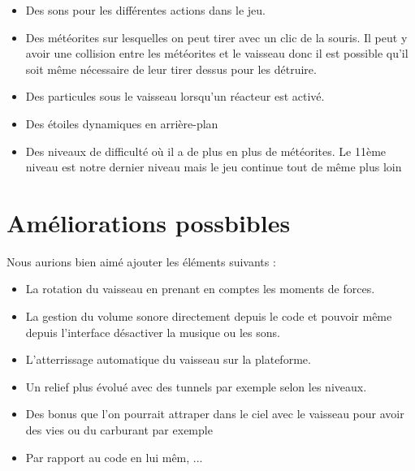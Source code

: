 \begin{itemize}
 \item Des sons pour les différentes actions dans le jeu.
\item Des météorites sur lesquelles on peut tirer avec un clic de la souris. Il peut y avoir une collision entre les météorites et le vaisseau donc il est possible qu’il soit même nécessaire de leur tirer dessus pour les détruire.
\item Des particules sous le vaisseau lorsqu’un réacteur est activé.
\item Des étoiles dynamiques en arrière-plan
\item 	Des niveaux de difficulté où il a de plus en plus de météorites. Le 11ème niveau est notre dernier niveau mais le jeu continue tout de même plus loin

\end{itemize}

\section{Améliorations possbibles}
Nous aurions bien aimé ajouter les éléments suivants :
\begin{itemize}
\item La rotation du vaisseau en prenant en comptes les moments de forces.
\item La gestion du volume sonore directement depuis le code et pouvoir même depuis l’interface désactiver la musique ou les sons.
 \item L’atterrissage automatique du vaisseau sur la plateforme.
\item Un relief plus évolué avec des tunnels par exemple selon les niveaux.
 \item Des bonus que l’on pourrait attraper dans le ciel avec le vaisseau pour avoir des vies ou du carburant par exemple
\item Par rapport au code en lui mêm, ...

\end{itemize}

